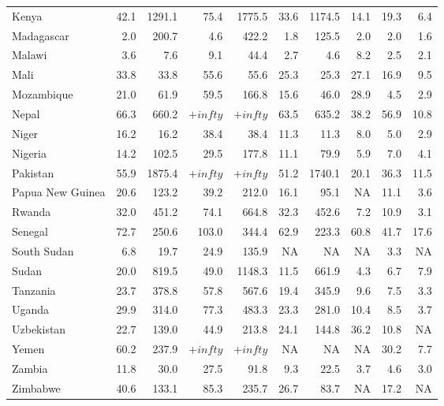 \begin{table}[b]
{\begin{tabular}[t]{lrrrrrrrrr}
Kenya & 42.1 & 1291.1 & 75.4 & 1775.5 & 33.6 & 1174.5 & 14.1 & 19.3 & 6.4\\
Madagascar & 2.0 & 200.7 & 4.6 & 422.2 & 1.8 & 125.5 & 2.0 & 2.0 & 1.6\\
Malawi & 3.6 & 7.6 & 9.1 & 44.4 & 2.7 & 4.6 & 8.2 & 2.5 & 2.1\\
Mali & 33.8 & 33.8 & 55.6 & 55.6 & 25.3 & 25.3 & 27.1 & 16.9 & 9.5\\
Mozambique & 21.0 & 61.9 & 59.5 & 166.8 & 15.6 & 46.0 & 28.9 & 4.5 & 2.9\\
Nepal & 66.3 & 660.2 & $+infty$ & $+infty$ & 63.5 & 635.2 & 38.2 & 56.9 & 10.8\\
Niger & 16.2 & 16.2 & 38.4 & 38.4 & 11.3 & 11.3 & 8.0 & 5.0 & 2.9\\
Nigeria & 14.2 & 102.5 & 29.5 & 177.8 & 11.1 & 79.9 & 5.9 & 7.0 & 4.1\\
Pakistan & 55.9 & 1875.4 & $+infty$ & $+infty$ & 51.2 & 1740.1 & 20.1 & 36.3 & 11.5\\
Papua New Guinea & 20.6 & 123.2 & 39.2 & 212.0 & 16.1 & 95.1 & NA & 11.1 & 3.6\\
Rwanda & 32.0 & 451.2 & 74.1 & 664.8 & 32.3 & 452.6 & 7.2 & 10.9 & 3.1\\
Senegal & 72.7 & 250.6 & 103.0 & 344.4 & 62.9 & 223.3 & 60.8 & 41.7 & 17.6\\
South Sudan & 6.8 & 19.7 & 24.9 & 135.9 & NA & NA & NA & 3.3 & NA\\
Sudan & 20.0 & 819.5 & 49.0 & 1148.3 & 11.5 & 661.9 & 4.3 & 6.7 & 7.9\\
Tanzania & 23.7 & 378.8 & 57.8 & 567.6 & 19.4 & 345.9 & 9.6 & 7.5 & 3.3\\
Uganda & 29.9 & 314.0 & 77.3 & 483.3 & 23.3 & 281.0 & 10.4 & 8.5 & 3.7\\
Uzbekistan & 22.7 & 139.0 & 44.9 & 213.8 & 24.1 & 144.8 & 36.2 & 10.8 & NA\\
Yemen & 60.2 & 237.9 & $+infty$ & $+infty$ & NA & NA & NA & 30.2 & 7.7\\
Zambia & 11.8 & 30.0 & 27.5 & 91.8 & 9.3 & 22.5 & 3.7 & 4.6 & 3.0\\
Zimbabwe & 40.6 & 133.1 & 85.3 & 235.7 & 26.7 & 83.7 & NA & 17.2 & NA\\
\bottomrule
\end{tabular}}
\end{table}